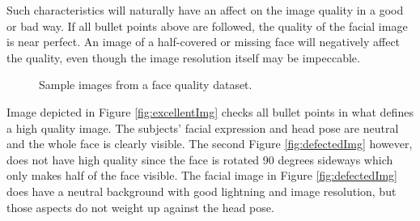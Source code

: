 Such characteristics will naturally have an affect on the image quality in a good or bad way. If all bullet points above are followed, the quality of the facial image is near perfect. An image of a half-covered or missing face will negatively affect the quality, even though the image resolution itself may be impeccable. 
\begin{figure}[h]
\centering
    \hspace{1.2cm}
    \caption{Sample images from a face quality dataset.}
\end{figure}
\newpage
Image depicted in Figure \ref{fig:excellentImg} checks all bullet points in what defines a high quality image. The subjects' facial expression and head pose are neutral and the whole face is clearly visible. The second Figure \ref{fig:defectedImg} however, does not have high quality since the face is rotated 90 degrees sideways which only makes half of the face visible. The facial image  in Figure \ref{fig:defectedImg} does have a neutral background with good lightning and image resolution, but those aspects do not weight up against the head pose.
%
